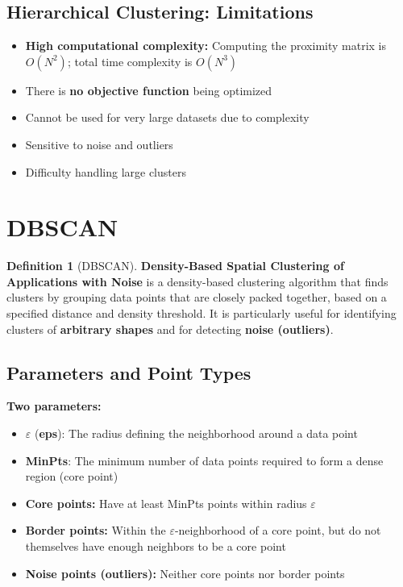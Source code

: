 \documentclass[11pt,a4paper]{article}
\theoremstyle{definition}
\newtheorem{definition}{Definition}[section]
\theoremstyle{plain}
\theoremstyle{remark}
\begin{document}
\subsection{Hierarchical Clustering: Limitations}

\begin{itemize}
    \item \textbf{High computational complexity:} Computing the proximity matrix is $O(N^2)$; total time complexity is $O(N^3)$
    \item There is \textbf{no objective function} being optimized
    \item Cannot be used for very large datasets due to complexity
    \item Sensitive to noise and outliers
    \item Difficulty handling large clusters
\end{itemize}


\section{DBSCAN}

\begin{definition}[DBSCAN]
\textbf{Density-Based Spatial Clustering of Applications with Noise} is a density-based clustering algorithm that finds clusters by grouping data points that are closely packed together, based on a specified distance and density threshold. It is particularly useful for identifying clusters of \textbf{arbitrary shapes} and for detecting \textbf{noise (outliers)}.
\end{definition}

\subsection{Parameters and Point Types}

\textbf{Two parameters:}
\begin{itemize}
    \item $\varepsilon$ (\textbf{eps}): The radius defining the neighborhood around a data point
    \item \textbf{MinPts}: The minimum number of data points required to form a dense region (core point)
\end{itemize}

\begin{tcolorbox}[colback=yellow!10!white,colframe=orange!75!black,title=\textbf{Three Types of Points}]
\begin{itemize}
    \item \textbf{Core points:} Have at least MinPts points within radius $\varepsilon$
    \item \textbf{Border points:} Within the $\varepsilon$-neighborhood of a core point, but do not themselves have enough neighbors to be a core point
    \item \textbf{Noise points (outliers):} Neither core points nor border points
\end{itemize}
\end{tcolorbox}
\end{document}
